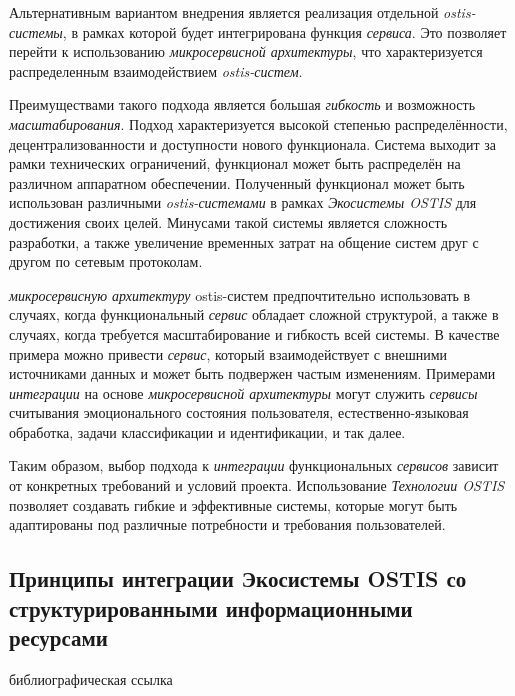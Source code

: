 Альтернативным вариантом внедрения является реализация отдельной \textit{ostis-системы}, в рамках которой будет интегрирована функция \textit{сервиса}. Это позволяет перейти к использованию \textit{микросервисной архитектуры}, что характеризуется распределенным взаимодействием \textit{ostis-систем}.

Преимуществами такого подхода является большая \textit{гибкость} и возможность \textit{масштабирования}. Подход характеризуется высокой степенью распределённости, децентрализованности и доступности нового функционала. Система выходит за рамки технических ограничений, функционал может быть распределён на различном аппаратном обеспечении. Полученный функционал может быть использован различными \textit{ostis-системами} в рамках \textit{Экосистемы OSTIS} для достижения своих целей. Минусами такой системы является сложность разработки, а также увеличение временных затрат на общение систем друг с другом по сетевым протоколам. 

\textit{микросервисную архитектуру} ostis-систем предпочтительно использовать в случаях, когда функциональный \textit{сервис} обладает сложной структурой, а также в случаях, когда требуется масштабирование и гибкость всей системы. В качестве примера можно привести \textit{сервис}, который взаимодействует с внешними источниками данных и может быть подвержен частым изменениям.  Примерами \textit{интеграции} на основе \textit{микросервисной архитектуры} могут служить \textit{сервисы} считывания эмоционального состояния пользователя, естественно-языковая обработка, задачи классификации и идентификации, и так далее.

Таким образом, выбор подхода к \textit{интеграции} функциональных \textit{сервисов} зависит от конкретных требований и условий проекта. Использование \textit{Технологии OSTIS} позволяет создавать гибкие и эффективные системы, которые могут быть адаптированы под различные потребности и требования пользователей.

\subsection{Принципы интеграции Экосистемы OSTIS со структурированными информационными ресурсами}
{\label{sec_integration_resources}} 

\begin{SCn}
\bigskip

\begin{scnrelfromlist}{библиографическая ссылка}
\end{scnrelfromlist}
\end{SCn}

